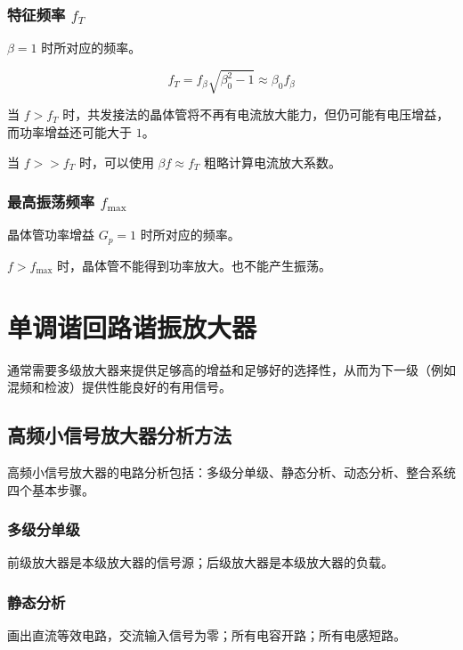 \subsubsection{特征频率 $f_T$}

$\beta = 1$ 时所对应的频率。

\begin{equation}
    f_T = f_{\beta} \sqrt{\beta_0^2 - 1} \approx \beta_0 f_{\beta} 
\end{equation}

当 $f > f_T$ 时，共发接法的晶体管将不再有电流放大能力，但仍可能有电压增益，而功率增益还可能大于 $1$。

当 $f >> f_T$ 时，可以使用 $\beta f \approx f_T$ 粗略计算电流放大系数。

\subsubsection{最高振荡频率 $f_{\text{max}}$}

晶体管功率增益 $G_p = 1$ 时所对应的频率。

$f>f_{\text{max}}$ 时，晶体管不能得到功率放大。也不能产生振荡。

\section{单调谐回路谐振放大器}

通常需要多级放大器来提供足够高的增益和足够好的选择性，从而为下一级（例如混频和检波）提供性能良好的有用信号。

\subsection{高频小信号放大器分析方法}

高频小信号放大器的电路分析包括：多级分单级、静态分析、动态分析、整合系统四个基本步骤。

\subsubsection{多级分单级}

前级放大器是本级放大器的信号源；后级放大器是本级放大器的负载。

\subsubsection{静态分析}

画出直流等效电路，交流输入信号为零；所有电容开路；所有电感短路。

